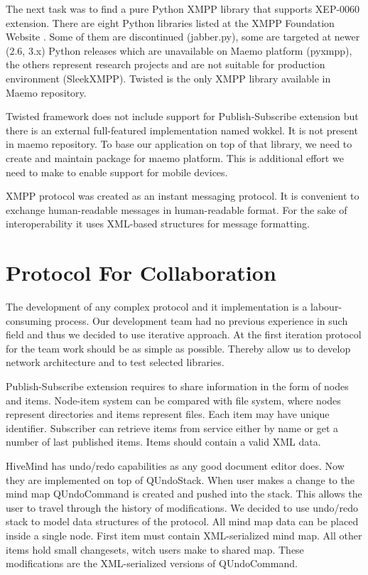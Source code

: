 The next task was to find a pure Python XMPP library that supports XEP-0060
extension. There are eight Python libraries listed at the XMPP Foundation
Website \cite{xmpp}. Some of them are discontinued (jabber.py), some are
targeted at newer (2.6, 3.x) Python releases which are unavailable on Maemo
platform (pyxmpp), the others represent research projects and are not suitable
for production environment (SleekXMPP). Twisted is the only XMPP library
available in Maemo repository.

Twisted framework does not include support for Publish-Subscribe extension but
there is an external full-featured implementation named wokkel.
It is not present in maemo repository. To base our application on top of that 
library, we need to create and maintain package for maemo platform. This is
additional effort we need to make to enable support for mobile devices.

XMPP protocol was created as an instant messaging protocol. It is convenient to
exchange human-readable messages in human-readable format. For the sake of 
interoperability it uses XML-based structures for message formatting. 

\section{Protocol For Collaboration}

 The development of any complex protocol and it implementation is a
 labour-consuming process. Our development team had no previous experience in
 such field and thus we decided to use iterative approach. At the first iteration
 protocol for the team work should be as simple as possible. Thereby allow us to
 develop network architecture and to test selected libraries.

 Publish-Subscribe extension requires to share information in the form of nodes
 and items. Node-item system can be compared with file system, where nodes
 represent directories and items represent files. Each item may have unique
 identifier. Subscriber can retrieve items from service either by name or get a
 number of last published items. Items should contain a valid XML data.

 HiveMind has undo/redo capabilities as any good document editor does. Now they
 are implemented on top of QUndoStack. When user makes a change to the mind map
 QUndoCommand is created and pushed into the stack. This allows the user to
 travel through the history of modifications. We decided to use undo/redo stack
 to model data structures of the protocol. All mind map data can be placed
 inside a single node. First item must contain XML-serialized mind map. All other
 items hold small changesets, witch users make to shared map. These modifications
 are the XML-serialized versions of QUndoCommand.


